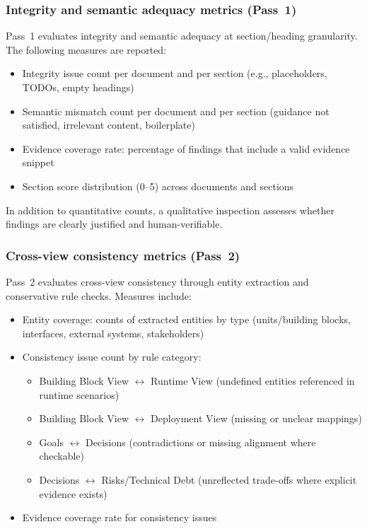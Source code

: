 \subsubsection{Integrity and semantic adequacy metrics (Pass~1)}
\label{sec:eval_pass1_metrics}

Pass~1 evaluates integrity and semantic adequacy at section/heading granularity. The following measures are reported:
\begin{itemize}
    \item Integrity issue count per document and per section (e.g., placeholders, TODOs, empty headings)
    \item Semantic mismatch count per document and per section (guidance not satisfied, irrelevant content, boilerplate)
    \item Evidence coverage rate: percentage of findings that include a valid evidence snippet
    \item Section score distribution (0--5) across documents and sections
\end{itemize}

In addition to quantitative counts, a qualitative inspection assesses whether findings are clearly justified and human-verifiable.

\subsubsection{Cross-view consistency metrics (Pass~2)}
\label{sec:eval_pass2_metrics}

Pass~2 evaluates cross-view consistency through entity extraction and conservative rule checks. Measures include:
\begin{itemize}
    \item Entity coverage: counts of extracted entities by type (units/building blocks, interfaces, external systems, stakeholders)
    \item Consistency issue count by rule category:
    \begin{itemize}
        \item Building Block View $\leftrightarrow$ Runtime View (undefined entities referenced in runtime scenarios)
        \item Building Block View $\leftrightarrow$ Deployment View (missing or unclear mappings)
        \item Goals $\leftrightarrow$ Decisions (contradictions or missing alignment where checkable)
        \item Decisions $\leftrightarrow$ Risks/Technical Debt (unreflected trade-offs where explicit evidence exists)
    \end{itemize}
    \item Evidence coverage rate for consistency issues
\end{itemize}


